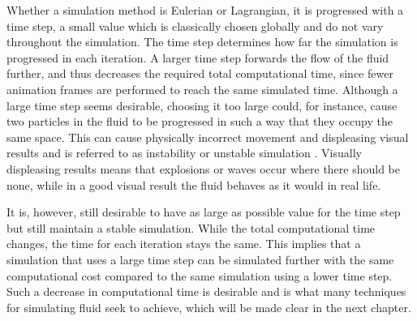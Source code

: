 \documentclass[../../main.tex]{subfiles}
\begin{document}
Whether a simulation method is Eulerian or Lagrangian, it is progressed with a time step, a small value which is classically chosen globally and do not vary throughout the simulation. The time step determines how far the simulation is progressed in each iteration. A larger time step forwards the flow of the fluid further, and thus decreases the required total computational time, since fewer animation frames are performed to reach the same simulated time. Although a large time step seems desirable, choosing it too large could, for instance, cause two particles in the fluid to be progressed in such a way that they occupy the same space. This can cause physically incorrect movement and displeasing visual results and is referred to as instability or unstable simulation \citep{ihmsen2014sph}. Visually displeasing results means that explosions or waves occur where there should be none, while in a good visual result the fluid behaves as it would in real life. 

It is, however, still desirable to have as large as possible value for the time step but still maintain a stable simulation. While the total computational time changes, the time for each iteration stays the same. This implies that a simulation that uses a large time step can be simulated further with the same computational cost compared to the same simulation using a lower time step. Such a decrease in computational time is desirable and is what many techniques for simulating fluid seek to achieve, which will be made clear in the next chapter.
\end{document}
